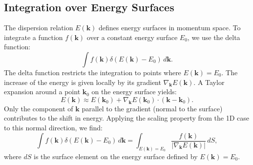 \documentclass[11pt]{article}
\begin{document}
\subsection{Integration over Energy Surfaces}
The dispersion relation $E(\mathbf{k})$ defines energy surfaces in momentum space. To integrate a function $f(\mathbf{k})$ over a constant energy surface $E_0$, we use the delta function:
\[
\int f(\mathbf{k}) \delta(E(\mathbf{k}) - E_0) \, d\mathbf{k}.
\]
The delta function restricts the integration to points where $E(\mathbf{k}) = E_0$. 
The increase of the energy is given locally by its gradient $\nabla_{\mathbf{k}} E(\mathbf{k})$. A Taylor expansion around a point $\mathbf{k}_0$ on the energy surface yields:
\[
E(\mathbf{k}) \approx E(\mathbf{k}_0) + \nabla_{\mathbf{k}} E(\mathbf{k}_0) \cdot (\mathbf{k} - \mathbf{k}_0).
\]
Only the component of $\mathbf{k}$ parallel to the gradient (normal to the surface) contributes to the shift in energy. Applying the scaling property from the 1D case to this normal direction, we find:
\[
\int f(\mathbf{k}) \delta(E(\mathbf{k}) - E_0) \, d\mathbf{k} = \int_{E(\mathbf{k}) = E_0} \frac{f(\mathbf{k})}{|\nabla_{\mathbf{k}} E(\mathbf{k})|} \, dS,
\]
where $dS$ is the surface element on the energy surface defined by $E(\mathbf{k}) = E_0$.
\end{document}

